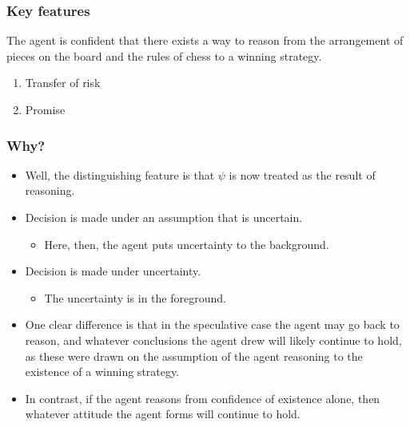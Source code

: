 \documentclass[10pt]{article}
\begin{document}
\subsubsection{Key features}
\label{sec:key-features}

The agent is confident that there exists a way to reason from the arrangement of pieces on the board and the rules of chess to a winning strategy.



\begin{enumerate}
\item Transfer of risk
\item Promise
\end{enumerate}


\subsubsection{Why?}
\label{sec:why}

\begin{itemize}
\item Well, the distinguishing feature is that \(\psi\) is now treated as the result of reasoning.
\end{itemize}

\begin{itemize}
\item Decision is made under an assumption that is uncertain.
  \begin{itemize}
  \item Here, then, the agent puts uncertainty to the background.
  \end{itemize}
\item Decision is made under uncertainty.
  \begin{itemize}
  \item The uncertainty is in the foreground.
  \end{itemize}
\end{itemize}

\begin{itemize}
\item One clear difference is that in the speculative case the agent may go back to reason, and whatever conclusions the agent drew will likely continue to hold, as these were drawn on the assumption of the agent reasoning to the existence of a winning strategy.
\item In contrast, if the agent reasons from confidence of existence alone, then whatever attitude the agent forms will continue to hold.
\end{itemize}
\end{document}
